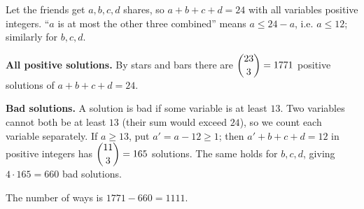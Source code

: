 Let the friends get $a,b,c,d$ shares, so $a+b+c+d=24$ with all variables positive integers. ``$a$ is at most the other three combined'' means $a\le24-a$, i.e. $a\le12$; similarly for $b,c,d$.

\textbf{All positive solutions.} By stars and bars there are $\dbinom{23}{3}=1771$ positive solutions of $a+b+c+d=24$.

\textbf{Bad solutions.} A solution is bad if some variable is at least $13$. Two variables cannot both be at least $13$ (their sum would exceed $24$), so we count each variable separately. If $a\ge13$, put $a'=a-12\ge1$; then $a'+b+c+d=12$ in positive integers has $\dbinom{11}{3}=165$ solutions. The same holds for $b,c,d$, giving $4\cdot165=660$ bad solutions.

The number of ways is $1771-660=\boxed{1111}$.
